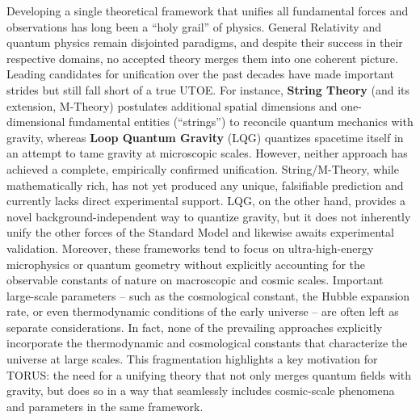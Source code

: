 \documentclass[
]{article}
\begin{document}
Developing a single theoretical framework that unifies all fundamental
forces and observations has long been a ``holy grail'' of physics.
General Relativity and quantum physics remain disjointed paradigms, and
despite their success in their respective domains, no accepted theory
merges them into one coherent picture. Leading candidates for
unification over the past decades have made important strides but still
fall short of a true UTOE. For instance, \textbf{String Theory} (and its
extension, M-Theory) postulates additional spatial dimensions and
one-dimensional fundamental entities (``strings'') to reconcile quantum
mechanics with gravity, whereas \textbf{Loop Quantum Gravity} (LQG)
quantizes spacetime itself in an attempt to tame gravity at microscopic
scales. However, neither approach has achieved a complete, empirically
confirmed unification. String/M-Theory, while mathematically rich, has
not yet produced any unique, falsifiable prediction and currently lacks
direct experimental support. LQG, on the other hand, provides a novel
background-independent way to quantize gravity, but it does not
inherently unify the other forces of the Standard Model and likewise
awaits experimental validation. Moreover, these frameworks tend to focus
on ultra-high-energy microphysics or quantum geometry without explicitly
accounting for the observable constants of nature on macroscopic and
cosmic scales. Important large-scale parameters -- such as the
cosmological constant, the Hubble expansion rate, or even thermodynamic
conditions of the early universe -- are often left as separate
considerations. In fact, none of the prevailing approaches explicitly
incorporate the thermodynamic and cosmological constants that
characterize the universe at large scales. This fragmentation highlights
a key motivation for TORUS: the need for a unifying theory that not only
merges quantum fields with gravity, but does so in a way that seamlessly
includes cosmic-scale phenomena and parameters in the same framework.
\end{document}
